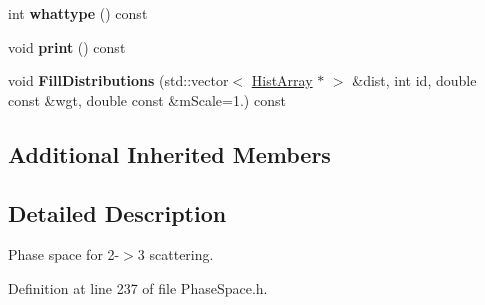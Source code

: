 \begin{DoxyCompactItemize}
\item 
\hypertarget{classPS__2__3_ab7105d8734ec97b22c0104bd451d619b}{int {\bfseries whattype} () const }\label{classPS__2__3_ab7105d8734ec97b22c0104bd451d619b}

\item 
\hypertarget{classPS__2__3_a98b7559fbc72002c2dd6dadb1db9be0b}{void {\bfseries print} () const }\label{classPS__2__3_a98b7559fbc72002c2dd6dadb1db9be0b}

\item 
\hypertarget{classPS__2__3_a26a7c2e7cc989094314149b770ba5d38}{void {\bfseries Fill\-Distributions} (std\-::vector$<$ \hyperlink{classHistArray}{Hist\-Array} $\ast$ $>$ \&dist, int id, double const \&wgt, double const \&m\-Scale=1.) const }\label{classPS__2__3_a26a7c2e7cc989094314149b770ba5d38}

\end{DoxyCompactItemize}
\subsection*{Additional Inherited Members}


\subsection{Detailed Description}
Phase space for 2-\/$>$3 scattering. 

Definition at line 237 of file Phase\-Space.\-h.



